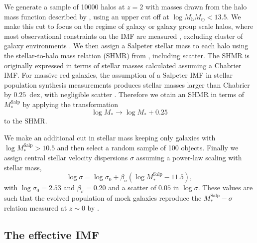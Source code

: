 \documentclass[usenatbib]{mnras}
\def\mhalo{M_{\mathrm{h}}}
\def\msalp{M_*^{\mathrm{Salp}}}
\def\Sref#1{Section~\ref{#1}\xspace}
\begin{document}
We generate a sample of 10000 halos at $z=2$ with masses drawn from the
  halo mass function described by \citet{Tin++08}, using an upper cut
  off at $\log{\mhalo}M_\odot < 13.5$.  We make this cut to focus on
the regime of galaxy or galaxy group scale halos, where most
observational constraints on the IMF are measured \citep{Gav++07},
excluding cluster of galaxy environments \citep[though IMF constraints
  are available for some brightest cluster galaxies;][]{New++13}.  We
then assign a Salpeter stellar mass to each halo using the
stellar-to-halo mass relation (SHMR) from \citet{Lea++12}, including
scatter. 
The \citet{Lea++12} SHMR is originally expressed in terms of stellar masses calculated assuming a Chabrier IMF. %
For massive red galaxies, the assumption of a Salpeter IMF in stellar population synthesis measurements produces stellar masses larger than Chabrier by $0.25$~dex, with negligible scatter \citep{Aug++10}. 
Therefore we otain an SHMR in terms of $\msalp$ by applying the transformation
\begin{equation}
\log{M_*} \rightarrow \log{M_*} + 0.25
\end{equation}
to the \citet{Lea++12} SHMR.

We make an additional cut in stellar mass keeping only
galaxies with $\log{\msalp} > 10.5$ and then select a random sample of
100 objects.  Finally we assign central stellar velocity dispersions
$\sigma$ assuming a power-law scaling with stellar mass,
\begin{equation}\label{eq:mason}
\log{\sigma} = \log{\sigma_0} + \beta_\sigma(\log{\msalp} - 11.5), 
\end{equation}
with $\log{\sigma_0}=2.53$ and $\beta_\sigma=0.20$ and a scatter of
$0.05$ in $\log{\sigma}$. These values are such that the evolved
  population of mock galaxies reproduce the $\msalp-\sigma$ relation
  measured at $z\sim0$ by \citet[][see
    \Sref{ssec:drymerger}]{Aug++10}.

\subsection{The effective IMF}
\label{ssect:imfform}
\end{document}
